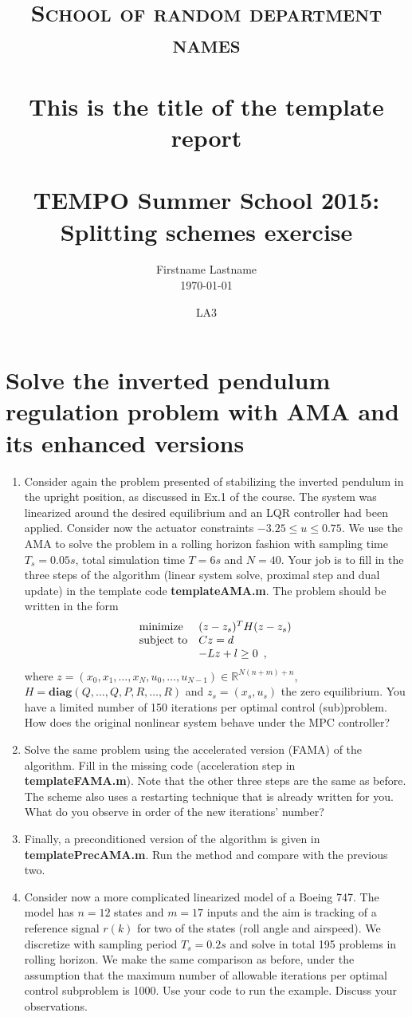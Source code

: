 \documentclass[paper=a4, fontsize=11pt]{scrartcl}
\title{
		\usefont{OT1}{bch}{b}{n}
		\normalfont \normalsize \textsc{School of random department names} \\ [25pt]
		\horrule{0.5pt} \\[0.4cm]
		\huge This is the title of the template report \\
		\horrule{2pt} \\[0.5cm]
}
\author{
		\normalfont 								\normalsize
        Firstname Lastname\\[-3pt]		\normalsize
        \today
}
\date{}
\title{TEMPO Summer School 2015: Splitting schemes exercise}
\newcommand{\reals}{{\mathbb{R} }}
\newcommand{\diag}{{\mathbf{diag} }}
\begin{document}
\author{LA3}

\maketitle

%
\section{Solve the inverted pendulum regulation problem with AMA and its enhanced versions}
\begin{enumerate}
\item
Consider again the problem presented of stabilizing the inverted pendulum in the upright position, as discussed in Ex.1 of the course. The system was linearized around the desired equilibrium and an LQR controller had been applied. Consider now the actuator constraints $-3.25\le u \le 0.75$. We use the AMA to solve the problem in a rolling horizon fashion with sampling time $T_s=0.05s$, total simulation time $T=6s$ and $N=40$. Your job is to fill in the three steps of the algorithm (linear system solve, proximal step and dual update) in the template code \textbf{templateAMA.m}. The problem should be written in the form
    \begin{equation}{\label{prob}}
    \begin{array}{ll}
      \mbox{minimize} & (z-z_s)^TH(z-z_s) \\
      \mbox{subject to} & Cz=d \\
                \quad & -Lz+l \ge 0 \enspace,
    \end{array}
    \end{equation}
where $z=(x_0,x_1,\ldots,x_N,u_0,\ldots,u_{N-1})\in\reals^{N(n+m)+n}$, $H=\diag(Q,\ldots,Q,P,R,\ldots,R)$ and $z_s=(x_s,u_s)$ the zero equilibrium.
You have a limited number of 150 iterations per optimal control (sub)problem. How does the original nonlinear system behave under the MPC controller?

\item
Solve the same problem using the accelerated version (FAMA) of the algorithm. Fill in the missing code (acceleration step in \textbf{templateFAMA.m}). Note that the other three steps are the same as before. The scheme also uses a restarting technique that is already written for you. What do you observe in order of the new iterations' number?

\item
Finally, a preconditioned version of the algorithm is given in \textbf{templatePrecAMA.m}. Run the method and compare with the previous two.

\item
Consider now a more complicated linearized model of a Boeing 747. The model has $n=12$ states and $m=17$ inputs and the aim is tracking of a reference signal $r(k)$ for two of the states (roll angle and airspeed). We discretize with sampling period $T_s=0.2s$ and solve in total 195 problems in rolling horizon. We make the same comparison as before, under the assumption that the maximum number of allowable iterations per optimal control subproblem is 1000. Use your code to run the example. Discuss your observations.


\end{enumerate}
\end{document}
